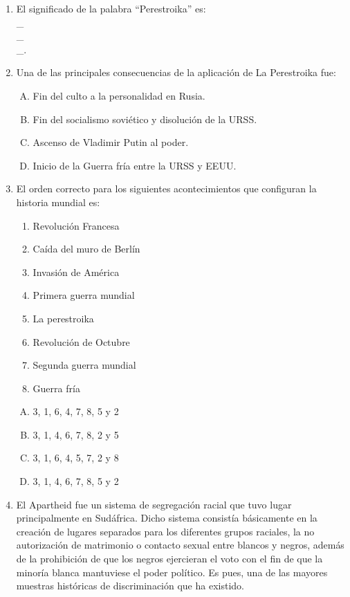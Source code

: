 \begin{enumerate}
\item El significado de la palabra ``Perestroika'' es: \label{socandres-12} \hrulefill\\
\_\hrulefill\\
\_\hrulefill\\
\_\hrulefill.

\item Una de las principales consecuencias de la aplicación de La Perestroika fue: \label{socandres-13}

\begin{enumerate}[(A)]
\item Fin del culto a la personalidad en Rusia.
\item Fin del socialismo soviético y disolución de la URSS.
\item Ascenso de Vladimir Putin al poder.
\item Inicio de la Guerra fría entre la URSS y EEUU.
\end{enumerate}


\item El orden correcto para los siguientes acontecimientos que configuran la historia mundial es: \label{socandres-14}


\begin{enumerate}[1.]
\item Revolución Francesa
\item Caída del muro de Berlín 
\item Invasión de América
\item Primera guerra mundial
\item La perestroika
\item Revolución de Octubre
\item Segunda guerra mundial
\item Guerra fría
\end{enumerate}

\begin{enumerate}[(A)]
\item 3, 1, 6, 4, 7, 8, 5 y 2
\item 3, 1, 4, 6, 7, 8, 2 y 5
\item 3, 1, 6, 4, 5, 7, 2 y 8
\item 3, 1, 4, 6, 7, 8, 5 y 2  
\end{enumerate}
\item El Apartheid fue un sistema de segregación racial que tuvo lugar principalmente en Sudáfrica. Dicho sistema consistía básicamente en la creación de lugares separados para los diferentes grupos raciales, la no autorización de matrimonio o contacto sexual entre blancos y negros, además de la prohibición de que los negros ejercieran el voto con el fin de que la minoría blanca mantuviese el poder político. Es pues, una de las mayores muestras históricas de discriminación que ha existido. \label{socandres-15}


\end{enumerate}

